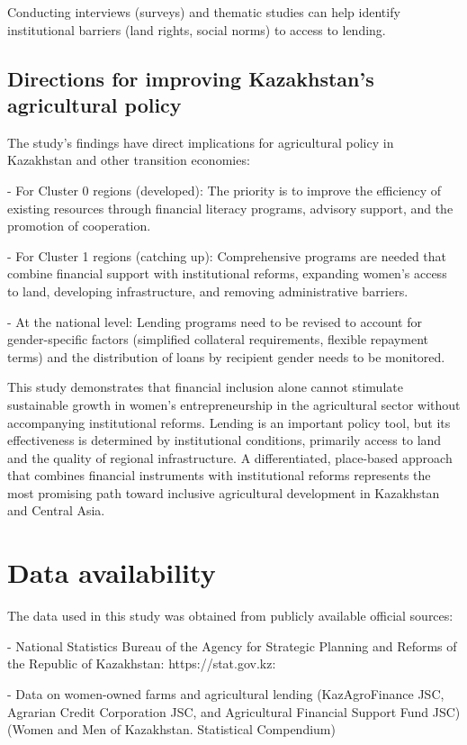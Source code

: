 ﻿\documentclass[sn-mathphys-num]{sn-jnl}
\begin{document}
Conducting interviews (surveys) and thematic studies can help identify
institutional barriers (land rights, social norms) to access to lending.

\subsection{Directions for improving Kazakhstan's agricultural policy}

The study's findings have direct implications for agricultural policy in
Kazakhstan and other transition economies:

- For Cluster 0 regions (developed): The priority is to improve the
efficiency of existing resources through financial literacy programs,
advisory support, and the promotion of cooperation.

- For Cluster 1 regions (catching up): Comprehensive programs are needed
that combine financial support with institutional reforms, expanding
women's access to land, developing infrastructure, and removing
administrative barriers.

- At the national level: Lending programs need to be revised to account
for gender-specific factors (simplified collateral requirements,
flexible repayment terms) and the distribution of loans by recipient
gender needs to be monitored.

This study demonstrates that financial inclusion alone cannot stimulate
sustainable growth in women's entrepreneurship in the agricultural
sector without accompanying institutional reforms. Lending is an
important policy tool, but its effectiveness is determined by
institutional conditions, primarily access to land and the quality of
regional infrastructure. A differentiated, place-based approach that
combines financial instruments with institutional reforms represents the
most promising path toward inclusive agricultural development in
Kazakhstan and Central Asia.

\section*{Data availability}

The data used in this study was obtained from publicly available
official sources:

- National Statistics Bureau of the Agency for Strategic Planning and
Reforms of the Republic of Kazakhstan: https://stat.gov.kz:

- Data on women-owned farms and agricultural lending (KazAgroFinance
JSC, Agrarian Credit Corporation JSC, and Agricultural Financial Support
Fund JSC) (Women and Men of Kazakhstan. Statistical Compendium)
\end{document}
